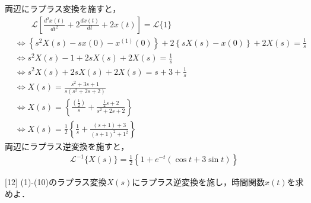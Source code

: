 \documentclass[a4paper,12pt]{article}
\begin{document}
\begin{tcolorbox}[title={[11] つぎの微分方程式をラプラス変換を用いて解け．\\
\[
\frac{d^2 x(t)}{dt^2} + 2\frac{dx(t)}{dt} + 2x(t) = 1 \\
\]

\quad ただし，初期条件は，$x(0)=1 , x^{(1)}(0)=1$ とする． }]

\quad 両辺にラプラス変換を施すと，
\begin{align*}
    &\qquad \mathcal{L}\left[ \frac{d^2 x(t)}{dt^2} + 2 \frac{dx(t)}{dt} + 2x(t) \right] = \mathcal{L}\{1\} \\
    &\Leftrightarrow \left\{s^2 X(s) - sx(0) - x^{(1)}(0) \right\} 
    + 2 \left\{ sX(s) - x(0) \right\} + 2X(s) 
    = \frac{1}{s} \\
    &\Leftrightarrow s^2 X(s) - 1 + 2sX(s) + 2X(s) = \frac{1}{s} \\
    &\Leftrightarrow s^2 X(s) + 2sX(s) + 2X(s) = s + 3 + \frac{1}{s} \\
    &\Leftrightarrow X(s) = \frac{s^2 + 3s + 1}{s(s^2 + 2s + 2)} \\
    &\Leftrightarrow X(s) = \left\{ \frac{\left(\frac{1}{2}\right)}{s} + \frac{\frac{1}{2}s+2}{s^2 + 2s + 2}  \right\} \\
    &\Leftrightarrow X(s) = \frac{1}{2} \left\{ \frac{1}{s} + \frac{\left(s+1\right)+3}{(s+1)^2 + 1^2}  \right\}
\end{align*}
\qquad 両辺にラプラス逆変換を施すと，
    \vspace{-3mm}
\begin{align*}
    \mathcal{L}^{-1}\{X(s)\} = \frac{1}{2} \left\{ 1 + e^{-t}(\cos t + 3 \sin t) \right\}
\end{align*}



\vspace{2mm}
\end{tcolorbox}

\newpage

[12] (1)-(10)のラプラス変換$X(s)$にラプラス逆変換を施し，時間関数$x(t)$を求めよ．\\
\end{document}
